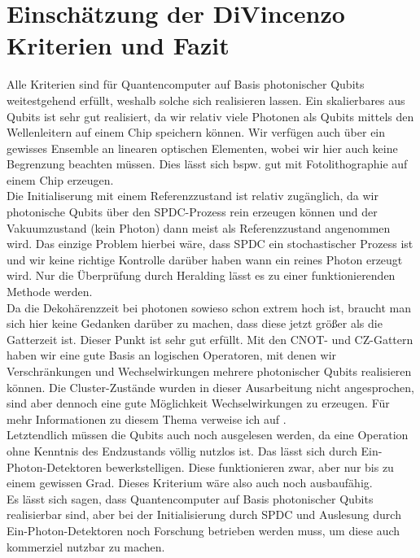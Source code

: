 \documentclass[11pt]{article}
\begin{document}
\section{Einschätzung der DiVincenzo Kriterien und Fazit}
Alle Kriterien sind für Quantencomputer auf Basis photonischer Qubits weitestgehend erfüllt, weshalb solche sich realisieren lassen.
Ein skalierbares aus Qubits ist sehr gut realisiert, da wir relativ viele Photonen als Qubits mittels den Wellenleitern auf
einem Chip speichern können. Wir verfügen auch über ein gewisses Ensemble an linearen optischen Elementen, wobei wir hier auch 
keine Begrenzung beachten müssen. Dies lässt sich bspw. gut mit Fotolithographie auf einem Chip erzeugen.\\
Die Initialiserung mit einem Referenzzustand ist relativ zugänglich, da wir photonische Qubits über den SPDC-Prozess rein erzeugen
können und der Vakuumzustand (kein Photon) dann meist als Referenzzustand angenommen wird. Das einzige Problem hierbei wäre, dass
SPDC ein stochastischer Prozess ist und wir keine richtige Kontrolle darüber haben wann ein reines Photon erzeugt wird. Nur die
Überprüfung durch Heralding lässt es zu einer funktionierenden Methode werden.\\
Da die Dekohärenzzeit bei photonen sowieso schon extrem hoch ist, braucht man sich hier keine Gedanken darüber zu machen, dass diese
jetzt größer als die Gatterzeit ist. Dieser Punkt ist sehr gut erfüllt.
Mit den CNOT- und CZ-Gattern haben wir eine gute Basis an logischen Operatoren, mit denen wir Verschränkungen und Wechselwirkungen
mehrere photonischer Qubits realisieren können. Die Cluster-Zustände wurden in dieser Ausarbeitung nicht angesprochen, sind aber dennoch eine gute 
Möglichkeit Wechselwirkungen zu erzeugen. Für mehr Informationen zu diesem Thema verweise ich auf \cite{O_Brien_2007}.\\
Letztendlich müssen die Qubits auch noch ausgelesen werden, da eine Operation ohne Kenntnis des Endzustands völlig nutzlos ist.
Das lässt sich durch Ein-Photon-Detektoren bewerkstelligen. Diese funktionieren zwar, aber nur bis zu einem gewissen Grad. Dieses
Kriterium wäre also auch noch ausbaufähig.\\
Es lässt sich sagen, dass Quantencomputer auf Basis photonischer Qubits realisierbar sind, aber bei der Initialisierung durch
SPDC und Auslesung durch Ein-Photon-Detektoren noch Forschung betrieben werden muss, um diese auch kommerziel nutzbar zu machen.
\newpage
\printbibliography
\end{document}
